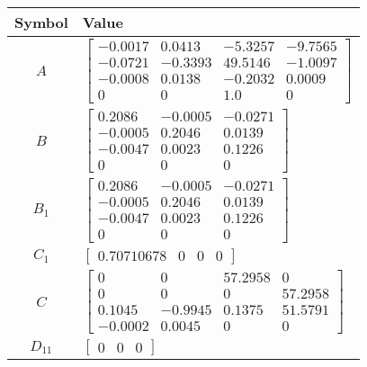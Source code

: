 \begin{tabular}{cl}
\hline
  Symbol  & Value                                                                                                                                                                      \\
\hline
   $A$    & $\left[\begin{matrix}-0.0017 & 0.0413 & -5.3257 & -9.7565\\-0.0721 & -0.3393 & 49.5146 & -1.0097\\-0.0008 & 0.0138 & -0.2032 & 0.0009\\0 & 0 & 1.0 & 0\end{matrix}\right]$ \\
   $B$    & $\left[\begin{matrix}0.2086 & -0.0005 & -0.0271\\-0.0005 & 0.2046 & 0.0139\\-0.0047 & 0.0023 & 0.1226\\0 & 0 & 0\end{matrix}\right]$                                       \\
 $B_{1}$  & $\left[\begin{matrix}0.2086 & -0.0005 & -0.0271\\-0.0005 & 0.2046 & 0.0139\\-0.0047 & 0.0023 & 0.1226\\0 & 0 & 0\end{matrix}\right]$                                       \\
 $C_{1}$  & $\left[\begin{matrix}0.70710678 & 0 & 0 & 0\end{matrix}\right]$                                                                                                            \\
   $C$    & $\left[\begin{matrix}0 & 0 & 57.2958 & 0\\0 & 0 & 0 & 57.2958\\0.1045 & -0.9945 & 0.1375 & 51.5791\\-0.0002 & 0.0045 & 0 & 0\end{matrix}\right]$                           \\
 $D_{11}$ & $\left[\begin{matrix}0 & 0 & 0\end{matrix}\right]$                                                                                                                         \\

\end{tabular}
